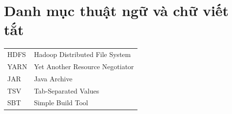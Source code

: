 \section*{Danh mục thuật ngữ và chữ viết tắt}

\begin{tabular}{ll}
    HDFS & Hadoop Distributed File System \\
    YARN & Yet Another Resource Negotiator \\
    JAR  & Java Archive \\
    TSV  & Tab-Separated Values \\
    SBT  & Simple Build Tool \\
\end{tabular}

